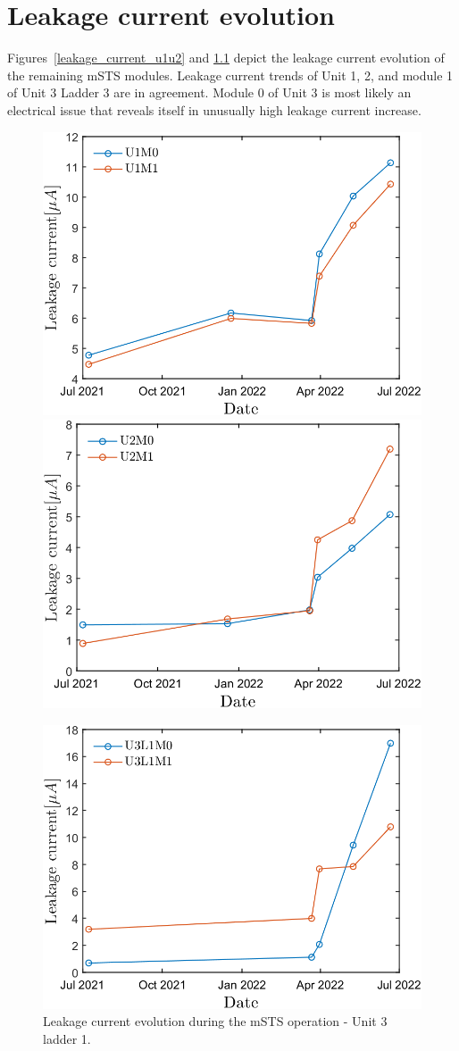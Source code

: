 \chapter{Leakage current evolution}
\label{Current}
Figures~\ref{leakage_current_u1u2} and \ref{leakage_current_u3l1} depict the leakage current evolution of the remaining \gls{mSTS} modules. Leakage current trends of Unit 1, 2, and module 1 of Unit 3 Ladder 3 are in agreement. Module 0 of Unit 3 is most likely an electrical issue that reveals itself in unusually high leakage current increase. 
\begin{figure}[h!]
\centering
\includegraphics[width=0.47\columnwidth]{Chapter6/DCS/images/sensors/U1_leakage.png}
\includegraphics[width=0.47\columnwidth]{Chapter6/DCS/images/sensors/U2_leakage.png}
\caption{Leakage current evolution during the \gls{mSTS} operation - Unit 1 and unit 2.}
\label{leakage_current_u1u2}
\includegraphics[width=0.5\columnwidth]{Chapter6/DCS/images/sensors/U3L1_leakage.png}
\caption{Leakage current evolution during the \gls{mSTS} operation - Unit 3 ladder 1.}
\label{leakage_current_u3l1}
\end{figure}



